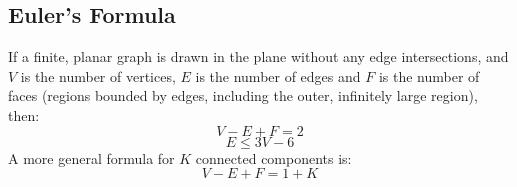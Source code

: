     \subsection{Euler's Formula}
    If a finite, planar graph is drawn in 
    the plane without any edge intersections, and $V$ is the 
    number of vertices, $E$ is the number of edges and $F$ is 
    the number of faces (regions bounded by edges, including 
    the outer, infinitely large region), then: 
    $$V - E + F = 2$$
    $$E \leq 3V-6$$
    A more general formula for $K$ connected components is:
    $$V - E + F = 1 + K$$
